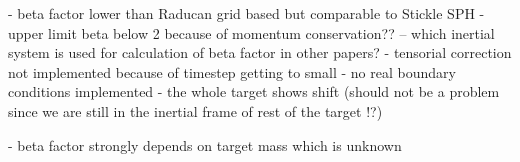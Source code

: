 - beta factor lower than Raducan grid based but comparable to Stickle SPH
- upper limit beta below 2 because of momentum conservation?? -- which inertial system is used for calculation of beta factor in other papers?
- tensorial correction not implemented because of timestep getting to small
- no real boundary conditions implemented
- the whole target shows shift (should not be a problem since we are still in the inertial frame of rest of the target !?)

- beta factor strongly depends on target mass which is unknown
